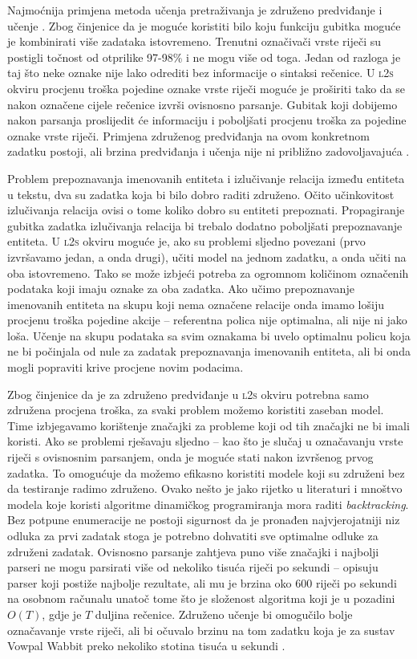 Najmoćnija primjena metoda učenja pretraživanja je združeno predviđanje i učenje
. Zbog činjenice da je moguće koristiti bilo
koju funkciju gubitka moguće je kombinirati više zadataka istovremeno. Trenutni
označivači vrste riječi su postigli točnost od otprilike 97-98\%
\citep{manning2011part} i ne mogu više od toga. Jedan od razloga je taj što neke
oznake nije lako odrediti bez informacije o sintaksi rečenice. U \textsc{l2s}
okviru procjenu troška pojedine oznake vrste riječi moguće je proširiti tako da
se nakon označene cijele rečenice izvrši ovisnosno parsanje. Gubitak koji
dobijemo nakon parsanja proslijedit će informaciju i poboljšati procjenu troška
za pojedine oznake vrste riječi. Primjena združenog predviđanja na ovom
konkretnom zadatku postoji, ali brzina predviđanja i učenja nije ni približno
zadovoljavajuća \citep{bohnet2012transition}.

Problem prepoznavanja imenovanih entiteta i izlučivanje relacija između entiteta
u tekstu, dva su zadatka koja bi bilo dobro raditi združeno. Očito učinkovitost
izlučivanja relacija ovisi o tome koliko dobro su entiteti prepoznati.
Propagiranje gubitka zadatka izlučivanja relacija bi trebalo dodatno poboljšati
prepoznavanje entiteta. U \textsc{l2s} okviru moguće je, ako su problemi sljedno
povezani (prvo izvršavamo jedan, a onda drugi), učiti model na jednom zadatku, a
onda učiti na oba istovremeno. Tako se može izbjeći potreba za ogromnom
količinom označenih podataka koji imaju oznake za oba zadatka. Ako učimo
prepoznavanje imenovanih entiteta na skupu koji nema označene relacije onda
imamo lošiju procjenu troška pojedine akcije -- referentna polica nije
optimalna, ali nije ni jako loša. Učenje na skupu podataka sa svim oznakama bi
uvelo optimalnu policu koja ne bi počinjala od nule za zadatak prepoznavanja
imenovanih entiteta, ali bi onda mogli popraviti krive procjene novim podacima.

Zbog činjenice da je za združeno predviđanje u \textsc{l2s} okviru potrebna samo
združena procjena troška, za svaki problem možemo koristiti zaseban model. Time
izbjegavamo korištenje značajki za probleme koji od tih značajki ne bi imali
koristi. Ako se problemi rješavaju sljedno -- kao što je slučaj u označavanju
vrste riječi s ovisnosnim parsanjem, onda je moguće stati nakon izvršenog prvog
zadatka. To omogućuje da možemo efikasno koristiti modele koji su združeni bez
da testiranje radimo združeno. Ovako nešto je jako rijetko u literaturi i
mnoštvo modela koje koristi algoritme dinamičkog programiranja mora raditi
\textit{backtracking}. Bez potpune enumeracije ne postoji sigurnost da je
pronađen najvjerojatniji niz odluka za prvi zadatak stoga je potrebno dohvatiti
sve optimalne odluke za združeni zadatak. Ovisnosno parsanje zahtjeva puno više
značajki i najbolji parseri ne mogu parsirati više od nekoliko tisuća riječi po
sekundi -- \citep{andor2016globally} opisuju parser koji postiže najbolje
rezultate, ali mu je brzina oko 600 riječi po sekundi na osobnom računalu unatoč
tome što je složenost algoritma koji je u pozadini $O(T)$, gdje je $T$ duljina
rečenice. Združeno učenje bi omogučilo bolje označavanje vrste riječi, ali bi
očuvalo brzinu na tom zadatku koja je za sustav Vowpal Wabbit preko nekoliko
stotina tisuća u sekundi \citep{daume14lts}.
